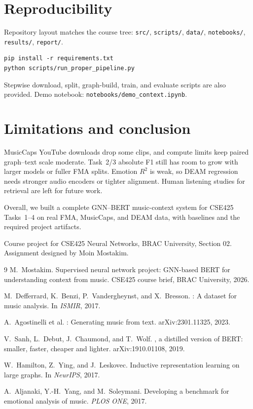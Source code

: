 \documentclass{article}
\begin{document}
\section{Reproducibility}
\label{sec:repro}

Repository layout matches the course tree: \texttt{src/}, \texttt{scripts/}, \texttt{data/}, \texttt{notebooks/}, \texttt{results/}, \texttt{report/}.
\begin{verbatim}
pip install -r requirements.txt
python scripts/run_proper_pipeline.py
\end{verbatim}
Stepwise download, split, graph-build, train, and evaluate scripts are also provided.
Demo notebook: \texttt{notebooks/demo\_context.ipynb}.

\section{Limitations and conclusion}
\label{sec:conc}

MusicCaps YouTube downloads drop some clips, and compute limits keep paired graph--text scale moderate.
Task~2/3 absolute F1 still has room to grow with larger models or fuller FMA splits.
Emotion $R^2$ is weak, so DEAM regression needs stronger audio encoders or tighter alignment.
Human listening studies for retrieval are left for future work.

Overall, we built a complete GNN--BERT music-context system for CSE425 Tasks~1--4 on real FMA, MusicCaps, and DEAM data, with baselines and the required project artifacts.

\begin{ack}
Course project for CSE425 Neural Networks, BRAC University, Section 02.
Assignment designed by Moin Mostakim.
\end{ack}

{\small
\begin{thebibliography}{9}
M.~Mostakim.
\newblock Supervised neural network project: GNN-based BERT for understanding context from music.
\newblock CSE425 course brief, BRAC University, 2026.

M.~Defferrard, K.~Benzi, P.~Vandergheynst, and X.~Bresson.
: A dataset for music analysis.
\newblock In \emph{ISMIR}, 2017.

A.~Agostinelli et al.
: Generating music from text.
\newblock arXiv:2301.11325, 2023.

V.~Sanh, L.~Debut, J.~Chaumond, and T.~Wolf.
, a distilled version of {BERT}: smaller, faster, cheaper and lighter.
\newblock arXiv:1910.01108, 2019.

W.~Hamilton, Z.~Ying, and J.~Leskovec.
\newblock Inductive representation learning on large graphs.
\newblock In \emph{NeurIPS}, 2017.

A.~Aljanaki, Y.-H.~Yang, and M.~Soleymani.
\newblock Developing a benchmark for emotional analysis of music.
\newblock \emph{PLOS ONE}, 2017.
\end{thebibliography}
}
\end{document}
